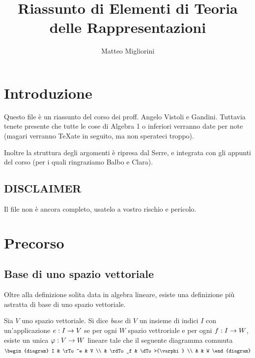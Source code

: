 \documentclass[a4paper,10pt,oneside]{math_article}
\title{Riassunto di Elementi di Teoria delle Rappresentazioni}
\author{Matteo Migliorini}
\date{}
\renewcommand{\phi}{\varphi}
\begin{document}
 
 
 \maketitle
 
 \cleardoublepage	
 \tableofcontents
 \cleardoublepage
 
  \section*{Introduzione}
   Questo file è un riassunto del corso dei proff. Angelo Vistoli e Gandini. Tuttavia tenete presente che tutte le cose di Algebra 1 o inferiori verranno date per note (magari verranno \TeX ate in seguito, ma non sperateci troppo).
   
   Inoltre la struttura degli argomenti è ripresa dal Serre, e integrata con gli appunti del corso (per i quali ringraziamo Balbo e Clara).

   \subsection*{DISCLAIMER}
    Il file non è ancora completo, usatelo a vostro rischio e pericolo.
  \section{Precorso}
    \subsection{Base di uno spazio vettoriale}
      Oltre alla definizione solita data in algebra lineare, esiste una definizione più astratta di base di uno spazio vettoriale.
      \begin{mydef}
       Sia $V$ uno spazio vettoriale. Si dice \emph{base} di $V$ un insieme di indici $I$ con un'applicazione $e: I \rightarrow V$ se per ogni $W$ spazio vettroriale e per ogni $f: I \rightarrow W$, esiste un unica $\phi: V \rar W$ lineare tale che il seguente diagramma commuta
       \[
        \begin{diagram}
         I & \rTo^e  & V \\
           & \rdTo_f & \dTo>{\phi}   \\
           &         & W
        \end{diagram}
       \]
      \end{mydef}
\end{document}
